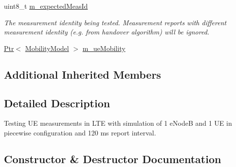 \begin{DoxyCompactItemize}
uint8\+\_\+t \hyperlink{classLteUeMeasurementsPiecewiseTestCase1_a39095f59bf1a01ce9b08d52ee7b89340}{m\+\_\+expected\+Meas\+Id}
\begin{DoxyCompactList}\small\item\em The measurement identity being tested. Measurement reports with different measurement identity (e.\+g. from handover algorithm) will be ignored. \end{DoxyCompactList}\item 
\hyperlink{classns3_1_1Ptr}{Ptr}$<$ \hyperlink{classns3_1_1MobilityModel}{Mobility\+Model} $>$ \hyperlink{classLteUeMeasurementsPiecewiseTestCase1_aa80f896fa30885c5f47acc4d3332228b}{m\+\_\+ue\+Mobility}
\end{DoxyCompactItemize}
\subsection*{Additional Inherited Members}


\subsection{Detailed Description}
Testing UE measurements in L\+TE with simulation of 1 e\+NodeB and 1 UE in piecewise configuration and 120 ms report interval. 

\subsection{Constructor \& Destructor Documentation}
